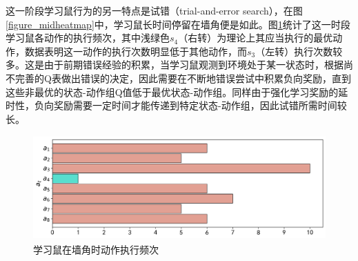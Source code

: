 这一阶段学习鼠行为的另一特点是试错（trial-and-error search），在图\ref{figure_midheatmap}中，学习鼠长时间停留在墙角便是如此。图\ref{figure_actioncnt}统计了这一时段学习鼠各动作的执行频次，其中浅绿色$s_4$（右转）为理论上其应当执行的最优动作，数据表明这一动作的执行次数明显低于其他动作，而$s_3$（左转）执行次数较多。这是由于前期错误经验的积累，当学习鼠观测到环境处于某一状态时，根据尚不完善的Q表做出错误的决定，因此需要在不断地错误尝试中积累负向奖励，直到这些非最优的状态-动作组Q值低于最优状态-动作组。同样由于强化学习奖励的延时性，负向奖励需要一定时间才能传递到特定状态-动作组，因此试错所需时间较长。
\begin{figure}[htbp]
  \vspace{13pt}
  \centering
  \includegraphics[height=4cm]{images/ch05/midterm/actioncnt.png}
  \caption{学习鼠在墙角时动作执行频次}\label{figure_actioncnt}
\end{figure} 